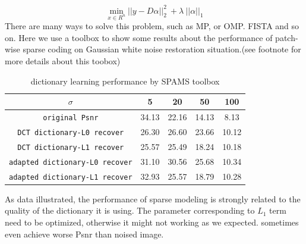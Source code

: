 \documentclass[a4paper,11pt]{article}
\begin{document}
 $$\mathop{\min}_{x \in R^n} ||y-D\alpha ||_2^2 \  + \lambda\ ||\alpha||_1 $$
 There are many ways to solve this problem, such as MP, or OMP. FISTA and so on. Here we use a toolbox to show some results about the performance of patch-wise sparse coding on Gaussian white noise restoration situation\cite{DBLP:journals/corr/MairalBP14}.(see footnote for more details about this toobox)
 \begin{table}[H]
 \centering
 \caption{dictionary learning performance by SPAMS toolbox}
 \begin{tabular}{ccccc}
 \toprule
  $\sigma$ & 5 & 20 & 50 & 100 \\
  \midrule
  \texttt{original Psnr}	& 34.13 & 22.16 &14.13 & 8.13   \\
   \texttt{DCT dictionary-L0 recover}	& 26.30 & 	26.60 & 23.66 & 10.12   \\
   \texttt{DCT dictionary-L1 recover}	& 25.57&	25.49 & 18.24 & 10.18  \\
   \texttt{adapted dictionary-L0 recover}	& 31.10	&30.56&	25.68&	10.34 \\
   \texttt{adapted dictionary-L1 recover}	& 32.93&	25.57&	18.79&	10.28 \\
	
  \bottomrule
 \end{tabular}
\end{table}
As data illustrated, the performance of sparse modeling is strongly related to the quality of the dictionary it is using. The parameter corresponding to $L_1$ term need to be optimized, otherwise it might not working as we expected. sometimes even achieve worse Psnr than noised image.
\end{document}
